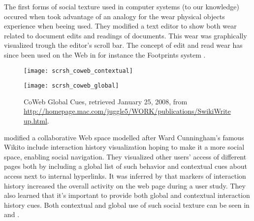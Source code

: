 The first forms of social texture used in computer systems (to our knowledge)
occured when \citet{hill92} took advantage of
\dash{}an analogy for the
wear physical objects experience when beeing used. They modified a text
editor to show both wear related to document edits and readings of documents.
This wear was graphically visualized trough the editor's scroll bar.
The concept of edit and read wear has since been used on the Web in for
instance the Footprints system \citep{wexelblat99}.

\begin{figure}
  \captionstyle{\raggedright}
  \begin{whole}
    \begin{minipage}[t]{0.475\wholewidth}
      \texttt{[image: scrsh\_coweb\_contextual]}
      \caption[CoWeb Contextual Cues]{%
        CoWeb Contextual Cues,
        retrieved January 25, 2008, from
        \url{http://homepage.mac.com/juggle5/WORK/publications/SwikiWriteup.html}.
      }
      \label{figure:scrsh.coweb.contextual}
    \end{minipage}
    \hfill
    \begin{minipage}[t]{0.475\wholewidth}
      \texttt{[image: scrsh\_coweb\_global]}
      \caption[CoWeb Global Cues]{%
        CoWeb Global Cues,
        retrieved January 25, 2008, from
        \url{http://homepage.mac.com/juggle5/WORK/publications/SwikiWriteup.html}.
      }
      \label{figure:scrsh.coweb.global}
    \end{minipage}
  \end{whole}
  \normalcaption
\end{figure}

\citet{dieberger00a} modified \dash{}a collaborative Web space
modelled after Ward Cunningham's famous Wiki\dash{}to include interaction
history visualization hoping to make it a more social space, enabling social
navigation. They visualized other users' access of different pages both by
including a global list of such behavior and contextual cues about access
next to internal hyperlinks.
It was inferred by \citeauthor{dieberger00a} that markers of interaction
history increased the overall activity on the web page during a user study.
They also learned that it's important to provide both global and
contextual interaction history cues. Both
contextual and global use of such social texture can be seen in
 and .

